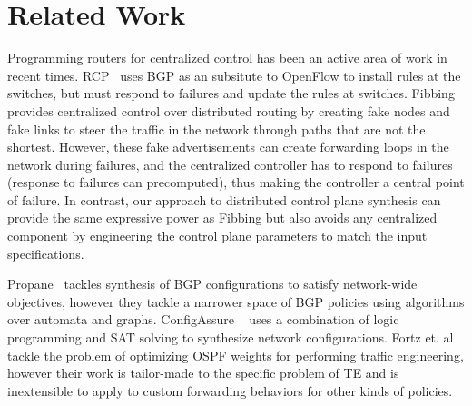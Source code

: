 \section{Related Work}
Programming routers for centralized control has been an
active area of work in recent times. RCP~\cite{rcp} uses
BGP as an subsitute to OpenFlow to install rules at the 
switches, but must respond to failures and update the 
rules at switches. Fibbing~\cite{fibbing} provides 
centralized control over distributed routing by creating 
fake nodes and fake links to steer the traffic in the 
network through paths that are not the shortest. However, 
these fake advertisements can create forwarding loops in the
network during failures, and the centralized controller 
has to respond to failures (response to failures can precomputed),
thus making the controller a central point of failure. In contrast,
our approach to distributed control plane synthesis can provide
the same expressive power as Fibbing but also
avoids any centralized component by engineering 
the control plane parameters to match the input specifications. 

 Propane~\cite{propane} 
tackles synthesis of BGP configurations to satisfy network-wide
objectives, however they tackle a narrower space of BGP policies
using algorithms over automata and graphs. ConfigAssure
~\cite{configassure} uses a combination of 
logic programming and SAT solving to synthesize network
configurations. Fortz et. al~\cite{ospf-te} tackle the 
problem of optimizing OSPF weights for performing traffic
engineering, however their work is tailor-made to the 
specific problem of TE and is inextensible to apply 
to custom forwarding behaviors for other kinds of policies.


